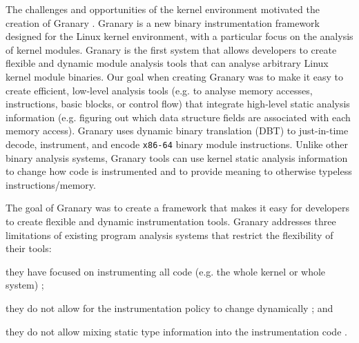 \documentclass[preprint]{sigplanconf}
\begin{document}

The challenges and opportunities of the kernel environment motivated the creation of Granary \cite{GranaryAtOSDI,GranaryAtASPLOS}. Granary is a new binary instrumentation framework designed for the Linux kernel environment, with a particular focus on the analysis of kernel modules. Granary is the first system that allows developers to create flexible and dynamic module analysis tools that can analyse arbitrary Linux kernel module binaries. Our goal when creating Granary was to make it easy to create efficient, low-level analysis tools (e.g. to analyse memory accesses, instructions, basic blocks, or control flow) that integrate high-level static analysis information (e.g. figuring out which data structure fields are associated with each memory access). Granary uses dynamic binary translation (DBT) to just-in-time decode, instrument, and encode \texttt{x86-64} binary module instructions. Unlike other binary analysis systems, Granary tools can use kernel static analysis information to change how code is instrumented and to provide meaning to otherwise typeless instructions/memory. 

The goal of Granary was to create a framework that makes it easy for developers to create flexible and dynamic instrumentation tools. Granary addresses three limitations of existing program analysis systems that restrict the flexibility of their tools: \begin{inparaenum}[(1)]
	\item they have focused on instrumenting all code (e.g. the whole kernel or whole system) \cite{DRK,QEMU,PinOS}; 
	\item they do not allow for the instrumentation policy to change dynamically \cite{Pin,DynamoRIO,QEMU}; and
	\item they do not allow mixing static type information into the instrumentation code  \cite{PinOS,Pin,DRK,DynamoRIO,QEMU}.
\end{inparaenum} 
\end{document}
